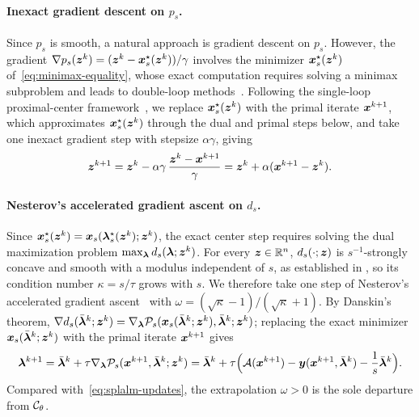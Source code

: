 \paragraph{Inexact gradient descent on \(p_s\).}
Since \(p_s\) is smooth, a natural approach is gradient descent on \(p_s\).
However, the gradient \(\nabla p_s(\bm{z}^k)=(\bm{z}^k-\bm{x}_s^\star(\bm{z}^k))/\gamma\)
involves the minimizer \(\bm{x}_s^\star(\bm{z}^k)\) of~\eqref{eq:minimax-equality},
whose exact computation requires solving a minimax subproblem and leads to
double-loop methods~\cite{kong2021accelerated,lin2020near}. Following
the single-loop proximal-center framework~\cite{zhang2020smoothed,li2026smoothing,zhang2026matching},
we replace \(\bm{x}_s^\star(\bm{z}^k)\) with the primal iterate \(\bm{x}^{k+1}\), which
approximates \(\bm{x}_s^\star(\bm{z}^k)\) through the dual and primal steps below, and take
one inexact gradient step with stepsize \(\alpha\gamma\), giving
\begin{equation}
    \bm{z}^{k+1}=\bm{z}^k-\alpha\gamma\,\frac{\bm{z}^k-\bm{x}^{k+1}}{\gamma}
    =\bm{z}^k+\alpha(\bm{x}^{k+1}-\bm{z}^k).
    \label{eq:fast-lralm-center-step}
\end{equation}
\paragraph{Nesterov's accelerated gradient ascent on \(d_s\).}
Since \(\bm{x}_s^\star(\bm{z}^k)=\bm{x}_s(\bm{\lambda}_s^\star(\bm{z}^k);\bm{z}^k)\), the exact center
step requires solving the dual maximization problem \(\max_{\bm{\lambda}}d_s(\bm{\lambda};\bm{z}^k)\). For every \(\bm{z}\in\mathbb{R}^n\),
\(d_s(\cdot;\bm{z})\) is \(s^{-1}\)-strongly concave and smooth with a modulus
independent of \(s\), as established in , so its condition number
\(\kappa=s/\tau\) grows with \(s\). We therefore take one step of Nesterov's
accelerated gradient ascent~\cite{nesterov2018lectures} with
\(\omega=(\sqrt{\kappa}-1)/(\sqrt{\kappa}+1)\). By Danskin's theorem,
\(\nabla d_s(\bar{\bm{\lambda}}^k;\bm{z}^k)
=\nabla_{\bm{\lambda}}\mathcal P_s(\bm{x}_s(\bar{\bm{\lambda}}^k;\bm{z}^k),\bar{\bm{\lambda}}^k;\bm{z}^k)\);
replacing the exact minimizer \(\bm{x}_s(\bar{\bm{\lambda}}^k;\bm{z}^k)\) with the primal
iterate \(\bm{x}^{k+1}\) gives
\begin{equation} 
    \bm{\lambda}^{k+1}
    =\bar{\bm{\lambda}}^k+\tau\nabla_{\bm{\lambda}}\mathcal P_s(\bm{x}^{k+1},\bar{\bm{\lambda}}^k;\bm{z}^k)
    =\bar{\bm{\lambda}}^k+\tau\Bigl(\mathcal{A}(\bm{x}^{k+1})-\bm{y}(\bm{x}^{k+1},\bar{\bm{\lambda}}^k)
    -\frac1s\bar{\bm{\lambda}}^k\Bigr).
    \label{eq:fast-lralm-dual-step}
\end{equation}
Compared with~\eqref{eq:splalm-updates}, the extrapolation \(\omega>0\) is the
sole departure from \(\mathcal{C}_\theta\).

